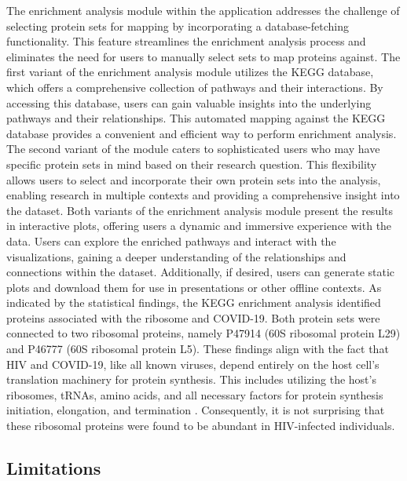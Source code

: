 \documentclass[
  11pt,
]{article}
\let\origfigure\figure
\begin{document}
The enrichment analysis module within the application addresses the challenge of selecting protein sets for mapping by incorporating a database-fetching functionality. This feature streamlines the enrichment analysis process and eliminates the need for users to manually select sets to map proteins against. The first variant of the enrichment analysis module utilizes the KEGG database, which offers a comprehensive collection of pathways and their interactions. By accessing this database, users can gain valuable insights into the underlying pathways and their relationships. This automated mapping against the KEGG database provides a convenient and efficient way to perform enrichment analysis.
The second variant of the module caters to sophisticated users who may have specific protein sets in mind based on their research question. This flexibility allows users to select and incorporate their own protein sets into the analysis, enabling research in multiple contexts and providing a comprehensive insight into the dataset. Both variants of the enrichment analysis module present the results in interactive plots, offering users a dynamic and immersive experience with the data. Users can explore the enriched pathways and interact with the visualizations, gaining a deeper understanding of the relationships and connections within the dataset. Additionally, if desired, users can generate static plots and download them for use in presentations or other offline contexts.
As indicated by the statistical findings, the KEGG enrichment analysis identified proteins associated with the ribosome and COVID-19. Both protein sets were connected to two ribosomal proteins, namely P47914 (60S ribosomal protein L29) and P46777 (60S ribosomal protein L5). These findings align with the fact that HIV and COVID-19, like all known viruses, depend entirely on the host cell's translation machinery for protein synthesis. This includes utilizing the host's ribosomes, tRNAs, amino acids, and all necessary factors for protein synthesis initiation, elongation, and termination \citep{Ohlmann2014}. Consequently, it is not surprising that these ribosomal proteins were found to be abundant in HIV-infected individuals.

\hypertarget{limitations}{%
\subsection{Limitations}\label{limitations}}

\bgroup  \origfigure[H] 
\end{document}
